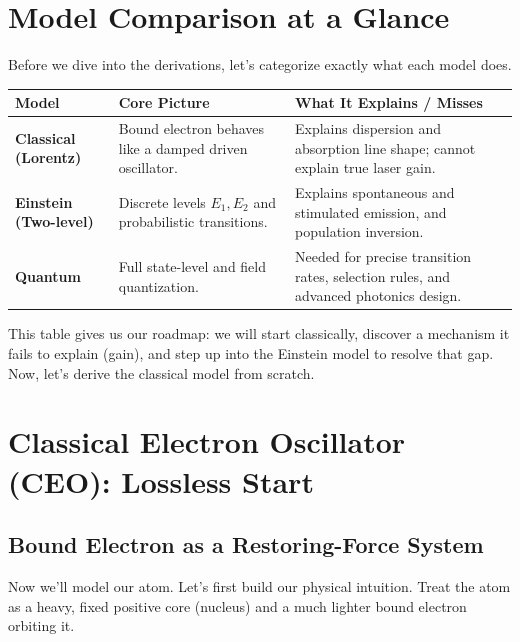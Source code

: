 \section{Model Comparison at a Glance}
Before we dive into the derivations, let's categorize exactly what each model does.

\begin{table}[H]
    \centering
    \begin{tabular}{@{} >{\raggedright\arraybackslash}p{} >{\raggedright\arraybackslash}p{} >{\raggedright\arraybackslash}p{} @{}}
        \toprule
        \textbf{Model}                & \textbf{Core Picture}                                     & \textbf{What It Explains / Misses}                                                   \\
        \midrule
        \textbf{Classical (Lorentz)}  & Bound electron behaves like a damped driven oscillator.   & Explains dispersion and absorption line shape; cannot explain true laser gain.       \\
        \textbf{Einstein (Two-level)} & Discrete levels $E_1, E_2$ and probabilistic transitions. & Explains spontaneous and stimulated emission, and population inversion.              \\
        \textbf{Quantum}              & Full state-level and field quantization.                  & Needed for precise transition rates, selection rules, and advanced photonics design. \\
        \bottomrule
    \end{tabular}
\end{table}

This table gives us our roadmap: we will start classically, discover a mechanism it fails to explain (gain), and step up into the Einstein model to resolve that gap. Now, let's derive the classical model from scratch.

\section{Classical Electron Oscillator (CEO): Lossless Start}
\subsection{Bound Electron as a Restoring-Force System}
Now we'll model our atom. Let's first build our physical intuition. Treat the atom as a heavy, fixed positive core (nucleus) and a much lighter bound electron orbiting it.

